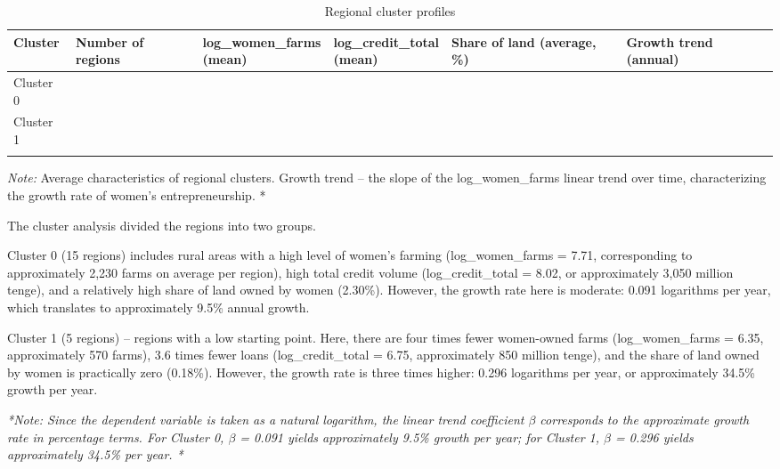 ﻿\documentclass[pdflatex,sn-mathphys-ay]{sn-jnl}
\begin{document}
\begin{table}[htbp]
\caption{Regional cluster profiles}\label{tab:cluster-profiles}
\scriptsize
\renewcommand{\arraystretch}{1.1}
\setlength{\tabcolsep}{3pt}
\begin{tabularx}{\textwidth}{>{\raggedright\arraybackslash}p{}>{\centering\arraybackslash}p{}>{\raggedright\arraybackslash}X>{\raggedright\arraybackslash}X>{\raggedright\arraybackslash}X>{\centering\arraybackslash}p{}}
\toprule
Cluster & Number of regions & \shortstack[l]{log\_women\_farms\\(mean)} & \shortstack[l]{log\_credit\_total\\(mean)} & Share of land (average, \%) & Growth trend (annual)\\
\midrule
Cluster 0 & 15 & 7.71 & 8.02 & 2.30 & 0.091\\
Cluster 1 & 5 & 6.35 & 6.75 & 0.18 & 0.296\\
\botrule
\end{tabularx}
\setlength{\tabcolsep}{6pt}
\renewcommand{\arraystretch}{1}
\end{table}

\emph{Note:} Average characteristics of regional clusters. Growth trend -- the
slope of the log\_women\_farms linear trend over time, characterizing
the growth rate of women's entrepreneurship. *

The cluster analysis divided the regions into two groups.

Cluster 0 (15 regions) includes rural areas with a high level of women's
farming (log\_women\_farms = 7.71, corresponding to approximately 2,230
farms on average per region), high total credit volume
(log\_credit\_total = 8.02, or approximately 3,050 million tenge), and a
relatively high share of land owned by women (2.30\%). However, the
growth rate here is moderate: 0.091 logarithms per year, which
translates to approximately 9.5\% annual growth.

Cluster 1 (5 regions) -- regions with a low starting point. Here, there
are four times fewer women-owned farms (log\_women\_farms = 6.35, approximately
570 farms), 3.6 times fewer loans (log\_credit\_total = 6.75, approximately 850
million tenge), and the share of land owned by women is practically zero
(0.18\%). However, the growth rate is three times higher: 0.296
logarithms per year, or approximately 34.5\% growth per year.

\emph{*Note: Since the dependent variable is taken as a natural
logarithm,
the linear trend coefficient $\beta$ corresponds to the approximate growth
rate in percentage terms. For Cluster 0, $\beta$ = 0.091 yields approximately 9.5\%
growth per year; for Cluster 1, $\beta$ = 0.296 yields approximately 34.5\% per
year. *}
\end{document}
